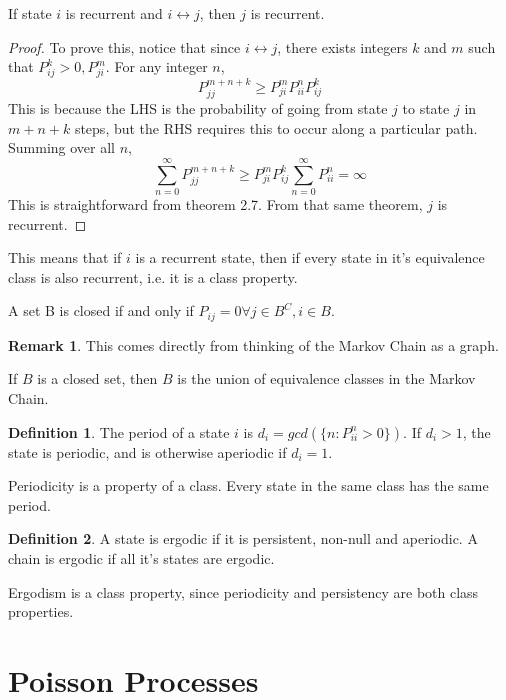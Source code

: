 \documentclass[12pt,letterpaper]{amsbook}
\theoremstyle{definition}
\newtheorem{definition}{Definition}%
\newtheorem*{remark}{Remark}
\begin{document}
\begin{theorem}
  If state $i$ is recurrent and $i \leftrightarrow j$, then $j$ is recurrent.
\end{theorem}
\begin{proof}
  To prove this, notice that since $i \leftrightarrow j$, there exists integers $k$ and $m$ such that $P^k_{ij} > 0, P^{m}_{ji}$. For any integer $n$, 
  \[P_{jj}^{m+n+k} \geq P_{ji}^m P_{ii}^n P_{ij}^k\]
  This is because the LHS is the probability of going from state $j$ to state $j$ in $m+n+k$ steps, but the RHS requires this to occur along a particular path. Summing over all $n$, 
  \[\sum_{n=0}^{\infty} P_{jj}^{m+n+k} \geq P_{ji}^m P_{ij}^k \sum_{n=0}^{\infty} P_{ii}^n = \infty\]
  This is straightforward from theorem 2.7. From that same theorem, $j$ is recurrent.
\end{proof}

This means that if $i$ is a recurrent state, then if every state in it's equivalence class is also recurrent, i.e. it is a class property.

\begin{theorem}
  A set B is closed if and only if $P_{ij} = 0 \forall j \in B^C, i \in B$.  
\end{theorem}
\begin{remark}
  This comes directly from thinking of the Markov Chain as a graph.
\end{remark}

\begin{theorem}
  If $B$ is a closed set, then $B$ is the union of equivalence classes in the Markov Chain.
\end{theorem}

\begin{definition}
  The period of a state $i$ is $d_i = gcd(\{n : P_{ii}^n > 0\})$. If $d_i > 1$, the state is periodic, and is otherwise aperiodic if $d_i=1$.
\end{definition}

Periodicity is a property of a class. Every state in the same class has the same period.

\begin{definition}
  A state is ergodic if it is persistent, non-null and aperiodic. A chain is ergodic if all it's states are ergodic. 
\end{definition}

Ergodism is a class property, since periodicity and persistency are both class properties.

\chapter{Poisson Processes}
\end{document}
